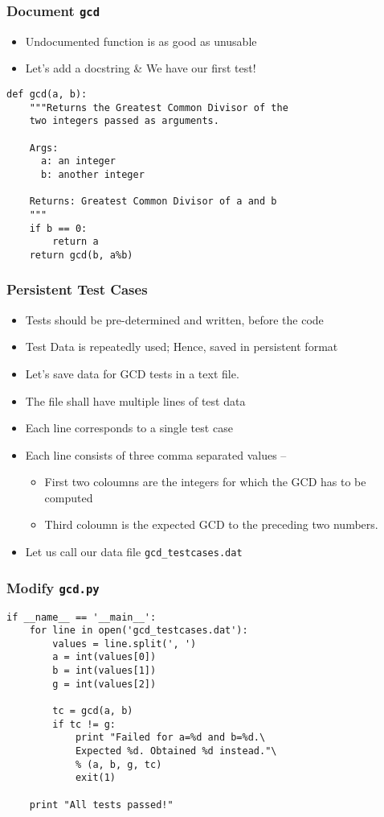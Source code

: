 \documentclass[12pt,presentation]{beamer}
\begin{document}
\begin{frame}[fragile]
  \frametitle{Document \texttt{gcd}}
  \begin{itemize}
  \item Undocumented function is as good as unusable
  \item Let's add a docstring \& We have our first test!
  \end{itemize}
\begin{lstlisting}
def gcd(a, b):
    """Returns the Greatest Common Divisor of the 
    two integers passed as arguments.

    Args:
      a: an integer
      b: another integer

    Returns: Greatest Common Divisor of a and b
    """
    if b == 0:
        return a
    return gcd(b, a%b)
\end{lstlisting}
\end{frame}


\begin{frame}[fragile]
  \frametitle{Persistent Test Cases}
  \begin{itemize}
  \item Tests should be pre-determined and written, before the code
  \item Test Data is repeatedly used; Hence, saved in persistent
    format
  \item Let's save data for GCD tests in a text file. 
  \item The file shall have multiple lines of test data
  \item Each line corresponds to a single test case
  \item Each line consists of three comma separated values --
    \begin{itemize}
    \item First two coloumns are the integers for which the GCD has to be
      computed
    \item Third coloumn is the expected GCD to the preceding two
      numbers.
    \end{itemize}
  \item Let us call our data file \texttt{gcd\_testcases.dat}
  \end{itemize}
\end{frame}

\begin{frame}[fragile]
  \frametitle{Modify \texttt{gcd.py}}
\begin{lstlisting}
if __name__ == '__main__':
    for line in open('gcd_testcases.dat'):
        values = line.split(', ')
        a = int(values[0])
        b = int(values[1])
        g = int(values[2])

        tc = gcd(a, b)
        if tc != g:
            print "Failed for a=%d and b=%d.\
            Expected %d. Obtained %d instead."\
            % (a, b, g, tc)
            exit(1)

    print "All tests passed!"
\end{lstlisting}
\end{frame}
\end{document}
